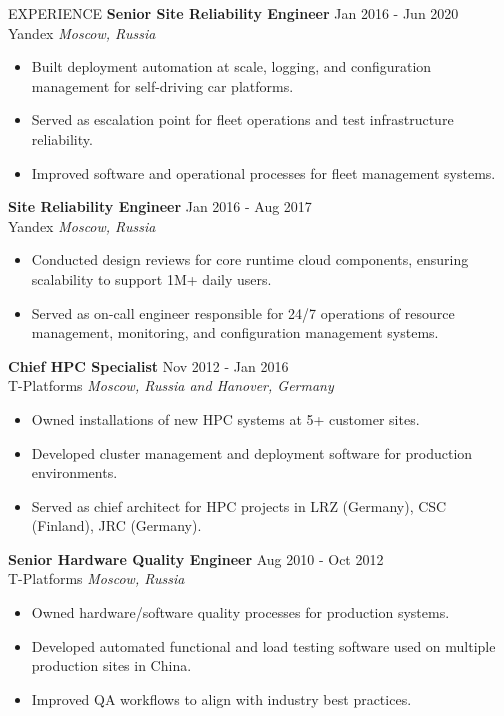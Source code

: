 \documentclass{resume} %
\begin{document}
\begin{rSection}{EXPERIENCE}
\textbf{Senior Site Reliability Engineer} \hfill Jan 2016 - Jun 2020\\
Yandex \hfill \textit{Moscow, Russia}
\begin{itemize}
   \itemsep -3pt {}
   \item Built deployment automation at scale, logging, and configuration management for self-driving car platforms.
   \item Served as escalation point for fleet operations and test infrastructure reliability.
   \item Improved software and operational processes for fleet management systems.
\end{itemize}

\textbf{Site Reliability Engineer} \hfill Jan 2016 - Aug 2017\\
Yandex \hfill \textit{Moscow, Russia}
\begin{itemize}
   \itemsep -3pt {}
   \item Conducted design reviews for core runtime cloud components, ensuring scalability to support 1M+ daily users.
   \item Served as on-call engineer responsible for 24/7 operations of resource management, monitoring, and configuration management systems.
\end{itemize}

\textbf{Chief HPC Specialist} \hfill Nov 2012 - Jan 2016\\
T-Platforms \hfill \textit{Moscow, Russia and Hanover, Germany}
\begin{itemize}
   \itemsep -3pt {}
   \item Owned installations of new HPC systems at 5+ customer sites.
   \item Developed cluster management and deployment software for production environments.
   \item Served as chief architect for HPC projects in LRZ (Germany), CSC (Finland), JRC (Germany).
\end{itemize}

\textbf{Senior Hardware Quality Engineer} \hfill Aug 2010 - Oct 2012\\
T-Platforms \hfill \textit{Moscow, Russia}
\begin{itemize}
   \itemsep -3pt {}
   \item Owned hardware/software quality processes for production systems.
   \item Developed automated functional and load testing software used on multiple production sites in China.
   \item Improved QA workflows to align with industry best practices.
\end{itemize}


\end{rSection}
\end{document}
